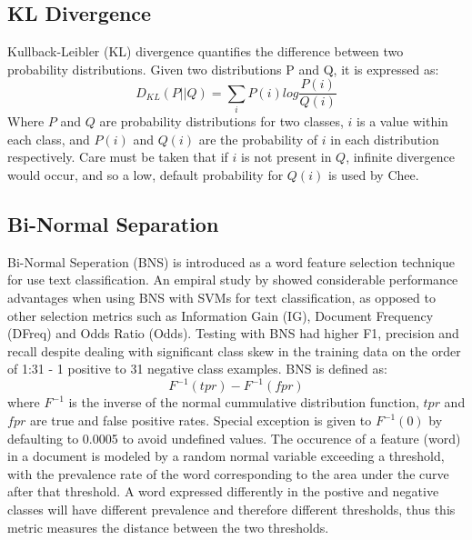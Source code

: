 \documentclass[twoside,11pt]{article}
\begin{document}
\subsection{KL Divergence}
Kullback-Leibler (KL) divergence quantifies the difference between two probability distributions. Given two distributions P and Q, it is expressed as:
\[
  D_{KL}(P||Q) = \sum_{i}P(i)log\frac{P(i)}{Q(i)}
\]
Where $P$ and $Q$ are probability distributions for two classes, $i$ is a value within each class, and $P(i)$ and $Q(i)$ are the probability of $i$ in each distribution respectively. Care must be taken that if $i$ is not present in $Q$, infinite divergence would occur, and so a low, default probability for $Q(i)$ is used by Chee.

\subsection{Bi-Normal Separation}
Bi-Normal Seperation (BNS) is introduced as a word feature selection technique for use text classification. An empiral study by \citep{Forman} showed considerable performance advantages when using BNS with SVMs for text classification, as opposed to other selection metrics such as Information Gain (IG), Document Frequency (DFreq) and Odds Ratio (Odds). Testing with BNS had higher F1, precision and recall despite dealing with significant class skew in the training data on the order of 1:31 - 1 positive to 31 negative class examples. BNS is defined as:
\[
  F^{-1}(tpr) - F^{-1}(fpr)
\]
where $F^{-1}$ is the inverse of the normal cummulative distribution function, $tpr$ and $fpr$ are true and false positive rates. Special exception is given to $F^{-1}(0)$ by defaulting to 0.0005 to avoid undefined values. The occurence of a feature (word) in a document is modeled by a random normal variable exceeding a threshold, with the prevalence rate of the word corresponding to the area under the curve after that threshold. A word expressed differently in the postive and negative classes will have different prevalence and therefore different thresholds, thus this metric measures the distance between the two thresholds.
\end{document}
